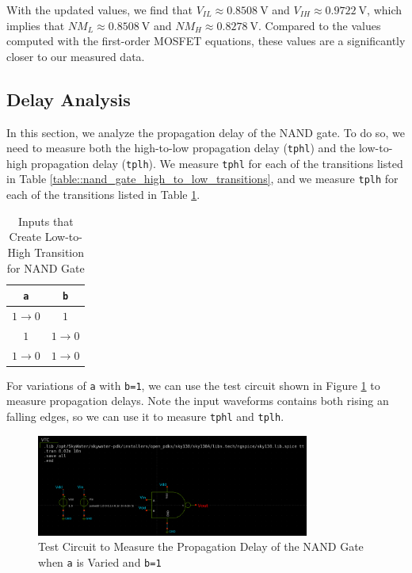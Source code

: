 \documentclass{article}
\begin{document}
	\noindent With the updated values, we find that $V_{IL} \approx 0.8508\ \text{V}$ and $V_{IH} \approx 0.9722\ \text{V}$, which implies that $NM_L \approx 0.8508\ \text{V}$ and $NM_H \approx 0.8278\ \text{V}$. Compared to the values computed with the first-order MOSFET equations, these values are a significantly closer to our measured data.
	
	\subsection{Delay Analysis}
	
	In this section, we analyze the propagation delay of the NAND gate. To do so, we need to measure both the high-to-low propagation delay (\texttt{tphl}) and the low-to-high propagation delay (\texttt{tplh}). We measure \texttt{tphl} for each of the transitions listed in Table \ref{table::nand_gate_high_to_low_transitions}, and we measure \texttt{tplh} for each of the transitions listed in Table \ref{table::nand_gate_low_to_high_transitions}.
	
	\begin{table}[H]
	\begin{center}
	\caption{Inputs that Create Low-to-High Transition for NAND Gate}
	\label{table::nand_gate_low_to_high_transitions}
	\begin{tabular}{| c | c |}
		\hline
		\texttt{a} & \texttt{b} \\
		\hline	
		$1 \rightarrow 0$ & $1$\\
		\hline	
		$1$ & $1 \rightarrow 0$\\
		\hline	
		$1 \rightarrow 0$ & $1 \rightarrow 0$\\
		\hline
	\end{tabular}
	\end{center}
	\end{table}
	
	\noindent For variations of \texttt{a} with \texttt{b=1}, we can use the test circuit shown in Figure \ref{fig::nand_delay_test_sweep_va} to measure propagation delays. Note the input waveforms contains both rising an falling edges, so we can use it to measure \texttt{tphl} and \texttt{tplh}.

	\begin{figure}[H]
		\centerline{\includegraphics[width=0.8\textwidth]{nand_delay_test_sweep_va.png}}
		\caption{Test Circuit to Measure the Propagation Delay of the NAND Gate when \texttt{a} is Varied and \texttt{b=1}}
		\label{fig::nand_delay_test_sweep_va}
	\end{figure}
	
\end{document}
